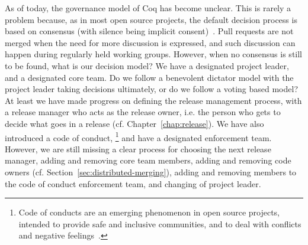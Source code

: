 As of today, the governance model of Coq has become unclear.
This is rarely a problem because, as in most open source projects, the default decision process is based on consensus (with silence being implicit consent)~\cite[Chapter 4]{fogel2005producing}.
Pull requests are not merged when the need for more discussion is expressed, and such discussion can happen during regularly held working groups.
However, when no consensus is still to be found, what is our decision model?
We have a designated project leader, and a designated core team.
Do we follow a benevolent dictator model with the project leader taking decisions ultimately, or do we follow a voting based model?
At least we have made progress on defining the release management process, with a release manager who acts as the release owner, i.e. the person who gets to decide what goes in a release (cf. Chapter~\ref{chap:release}).
We have also introduced a code of conduct,%
\footnote{
	Code of conducts are an emerging phenomenon in open source projects, intended to provide safe and inclusive communities, and to deal with conflicts and negative feelings~\cite{tourani2017code}.
}
and have a designated enforcement team.
However, we are still missing a clear process for choosing the next release manager, adding and removing core team members, adding and removing code owners (cf. Section~\ref{sec:distributed-merging}), adding and removing members to the code of conduct enforcement team, and changing of project leader.
